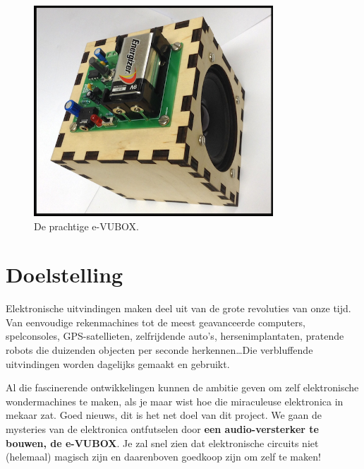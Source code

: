 \documentclass{article}
\begin{document}
	
	\maketitle

	\begin{figure}[htbp]
		\centering
		\includegraphics[width=0.8\textwidth]{foto.jpg}
		\caption{De prachtige e-VUBOX.}
		\label{fig:foto}
	\end{figure}

	\clearpage
	\tableofcontents
	\clearpage

	\section{Doelstelling}
		Elektronische uitvindingen maken deel uit van de grote revoluties van onze tijd. Van eenvoudige rekenmachines tot de meest geavanceerde computers, spelconsoles, GPS-satellieten, zelfrijdende auto's, hersenimplantaten, pratende robots die duizenden objecten per seconde herkennen\ldots Die verbluffende uitvindingen worden dagelijks gemaakt en gebruikt.

		Al die fascinerende ontwikkelingen kunnen de ambitie geven om zelf elektronische wondermachines te maken, als je maar wist hoe die miraculeuse elektronica in mekaar zat. Goed nieuws, dit is het net doel van dit project. We gaan de mysteries van de elektronica ontfutselen door \textbf{een audio-versterker te bouwen, de e-VUBOX}. Je zal snel zien dat elektronische circuits niet (helemaal) magisch zijn en daarenboven goedkoop zijn om zelf te maken!

\end{document}
